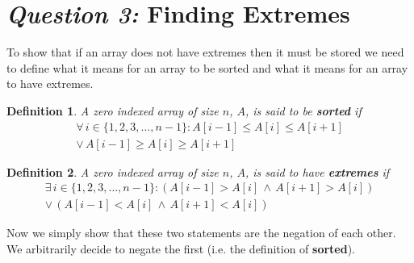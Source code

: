 \documentclass[12pt]{article}
\newtheorem*{definition}{Definition}
\begin{document}






\section{\textit{Question 3:} Finding Extremes}







To show that if an array does not have extremes then it must be
stored we need to define what it means for an array to be sorted
and what it means for an array to have extremes.

\begin{definition}
  A zero indexed array of size $n$, $A$, is said to be
  \textbf{sorted} if
  \begin{align*}
    \forall \, i \in \{1,2,3,\ldots,n-1\} :
    A[i-1] \leq A[i] \leq A[i+1] \\
    \vee \,
    A[i-1] \geq A[i] \geq A[i+1]
  \end{align*}
\end{definition}

\begin{definition}
  A zero indexed array of size $n$, $A$, is said to have
  \textbf{extremes} if
  \begin{align*}
    \exists \, i \in \{1,2,3,\ldots,n-1\} :
    (A[i-1] > A[i] \, \wedge \, A[i+1] > A[i]) \\ 
    \vee \,
    (A[i-1] < A[i] \, \wedge \, A[i+1] < A[i])
  \end{align*}
\end{definition}

Now we simply show that these two statements are the negation of
each other. We arbitrarily decide to negate the first (i.e. the
definition of \textbf{sorted}).
\end{document}
